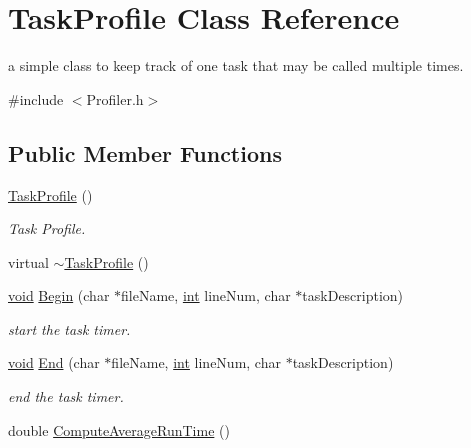 \hypertarget{class_task_profile}{}\section{Task\+Profile Class Reference}
\label{class_task_profile}


a simple class to keep track of one task that may be called multiple times.  




{\ttfamily \#include $<$Profiler.\+h$>$}

\subsection*{Public Member Functions}
\begin{DoxyCompactItemize}
\item 
\hyperlink{class_task_profile_a5e21b7038ee76abde829f6a32610c4d4}{Task\+Profile} ()
\begin{DoxyCompactList}\small\item\em Task Profile. \end{DoxyCompactList}\item 
virtual \hyperlink{class_task_profile_af60ba330fe127685f5cb8cba725efabd}{$\sim$\+Task\+Profile} ()
\item 
\hyperlink{sound_8c_ae35f5844602719cf66324f4de2a658b3}{void} \hyperlink{class_task_profile_adab9f9487da428514c2dac2ed08193c0}{Begin} (char $\ast$file\+Name, \hyperlink{xmltok_8h_a5a0d4a5641ce434f1d23533f2b2e6653}{int} line\+Num, char $\ast$task\+Description)
\begin{DoxyCompactList}\small\item\em start the task timer. \end{DoxyCompactList}\item 
\hyperlink{sound_8c_ae35f5844602719cf66324f4de2a658b3}{void} \hyperlink{class_task_profile_a044eda0ba41f2cf263b9e909bcd73161}{End} (char $\ast$file\+Name, \hyperlink{xmltok_8h_a5a0d4a5641ce434f1d23533f2b2e6653}{int} line\+Num, char $\ast$task\+Description)
\begin{DoxyCompactList}\small\item\em end the task timer. \end{DoxyCompactList}\item 
double \hyperlink{class_task_profile_a370b6581558df245dfa73cd988e21729}{Compute\+Average\+Run\+Time} ()
\end{DoxyCompactItemize}
